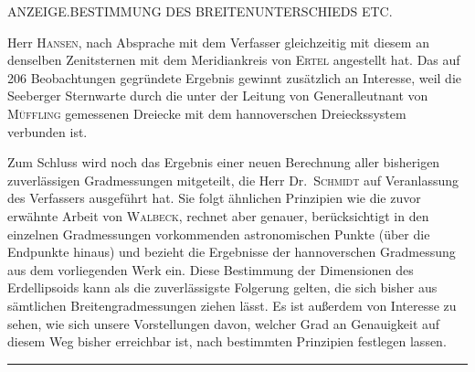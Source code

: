 \clearpage
\noindent{}\parbox{\dimexpr\linewidth-4em\relax}{\centering\small ANZEIGE.\quad BESTIMMUNG DES BREITENUNTERSCHIEDS ETC.}\hfill\mbox{}\par
\noindent Herr \textsc{Hansen}, nach Absprache mit dem Verfasser gleichzeitig mit diesem an
denselben Zenitsternen mit dem Meridiankreis von \textsc{Ertel} angestellt hat. Das auf
206 Beobachtungen gegründete Ergebnis gewinnt zusätzlich an Interesse, weil die Seeberger
Sternwarte durch die unter der Leitung von Generalleutnant von \textsc{Müffling} gemessenen
Dreiecke mit dem hannoverschen Dreieckssystem verbunden ist.

Zum Schluss wird noch das Ergebnis einer neuen Berechnung aller bisherigen zuverlässigen
Gradmessungen mitgeteilt, die Herr Dr.\ \textsc{Schmidt} auf Veranlassung des Verfassers
ausgeführt hat. Sie folgt ähnlichen Prinzipien wie die zuvor erwähnte Arbeit von \textsc{Walbeck},
rechnet aber genauer, berücksichtigt  in den einzelnen Gradmessungen
vorkommenden astronomischen Punkte (über die Endpunkte hinaus) und bezieht die Ergebnisse der
hannoverschen Gradmessung aus dem vorliegenden Werk ein. Diese Bestimmung der Dimensionen des
Erdellipsoids kann als die zuverlässigste Folgerung gelten, die sich bisher aus sämtlichen
Breitengradmessungen ziehen lässt. Es ist außerdem von Interesse zu sehen, wie sich unsere
Vorstellungen davon, welcher Grad an Genauigkeit auf diesem Weg bisher erreichbar ist, nach
bestimmten Prinzipien festlegen lassen.
\begin{center}\rule{.25\textwidth}{.4pt}\end{center}

